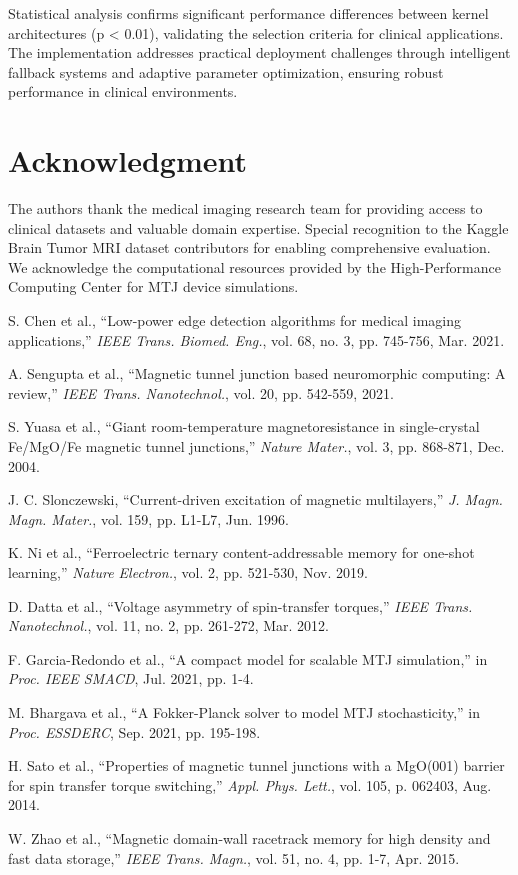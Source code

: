 \documentclass[conference]{IEEEtran}
\begin{document}
Statistical analysis confirms significant performance differences between kernel architectures (p < 0.01), validating the selection criteria for clinical applications. The implementation addresses practical deployment challenges through intelligent fallback systems and adaptive parameter optimization, ensuring robust performance in clinical environments.

\section*{Acknowledgment}

The authors thank the medical imaging research team for providing access to clinical datasets and valuable domain expertise. Special recognition to the Kaggle Brain Tumor MRI dataset contributors for enabling comprehensive evaluation. We acknowledge the computational resources provided by the High-Performance Computing Center for MTJ device simulations.

\begin{thebibliography}{00}
 S. Chen et al., ``Low-power edge detection algorithms for medical imaging applications,'' \textit{IEEE Trans. Biomed. Eng.}, vol. 68, no. 3, pp. 745-756, Mar. 2021.

 A. Sengupta et al., ``Magnetic tunnel junction based neuromorphic computing: A review,'' \textit{IEEE Trans. Nanotechnol.}, vol. 20, pp. 542-559, 2021.

 S. Yuasa et al., ``Giant room-temperature magnetoresistance in single-crystal Fe/MgO/Fe magnetic tunnel junctions,'' \textit{Nature Mater.}, vol. 3, pp. 868-871, Dec. 2004.

 J. C. Slonczewski, ``Current-driven excitation of magnetic multilayers,'' \textit{J. Magn. Magn. Mater.}, vol. 159, pp. L1-L7, Jun. 1996.

 K. Ni et al., ``Ferroelectric ternary content-addressable memory for one-shot learning,'' \textit{Nature Electron.}, vol. 2, pp. 521-530, Nov. 2019.

 D. Datta et al., ``Voltage asymmetry of spin-transfer torques,'' \textit{IEEE Trans. Nanotechnol.}, vol. 11, no. 2, pp. 261-272, Mar. 2012.

 F. Garcia-Redondo et al., ``A compact model for scalable MTJ simulation,'' in \textit{Proc. IEEE SMACD}, Jul. 2021, pp. 1-4.

 M. Bhargava et al., ``A Fokker-Planck solver to model MTJ stochasticity,'' in \textit{Proc. ESSDERC}, Sep. 2021, pp. 195-198.

 H. Sato et al., ``Properties of magnetic tunnel junctions with a MgO(001) barrier for spin transfer torque switching,'' \textit{Appl. Phys. Lett.}, vol. 105, p. 062403, Aug. 2014.

 W. Zhao et al., ``Magnetic domain-wall racetrack memory for high density and fast data storage,'' \textit{IEEE Trans. Magn.}, vol. 51, no. 4, pp. 1-7, Apr. 2015.

\end{thebibliography}
\end{document}
